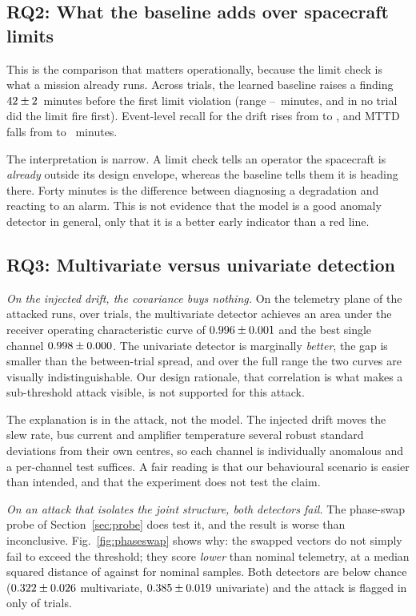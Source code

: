 \documentclass[10pt,journal]{IEEEtran}
\begin{document}
\subsection{RQ2: What the baseline adds over spacecraft limits}

This is the comparison that matters operationally, because the limit check is
what a mission already runs. Across trials, the learned baseline raises a
finding
$42 \pm 2$~minutes before the first limit violation (range
\expLeadMin--\expLeadMax~minutes, and in no trial did the limit fire first).
Event-level recall for the drift rises from \expRecAnomalyRules{} to
\expRecAnomalousBehavior{}, and MTTD falls from \expMttdAnomalyRules{} to
\expMttdAnomalyAll{}~minutes.

The interpretation is narrow. A limit check tells an operator the spacecraft
is \emph{already} outside its design envelope, whereas the baseline tells them
it is heading there. Forty minutes is the difference between diagnosing a
degradation and reacting to an alarm. This is not evidence that the model is a
good anomaly detector in general, only that it is a better early indicator than
a red line.

\subsection{RQ3: Multivariate versus univariate detection}

\emph{On the injected drift, the covariance buys nothing.} On the telemetry
plane of the attacked runs, over \expNumSeeds{} trials, the multivariate
detector achieves an area under the receiver operating characteristic curve of
$0.996 \pm 0.001$ and the best single channel
$0.998 \pm 0.000$. The univariate detector is marginally
\emph{better}, the gap is smaller than the between-trial spread, and over the
full range the two curves are visually indistinguishable.
Our design rationale, that correlation is what makes a sub-threshold attack
visible, is not supported for this attack.

The explanation is in the attack, not the model. The injected drift moves the
slew rate, bus current and amplifier temperature several robust standard
deviations from their own centres, so each channel is individually anomalous and
a per-channel test suffices. A fair reading is that our behavioural scenario is
easier than intended, and that the experiment does not test the claim.

\emph{On an attack that isolates the joint structure, both detectors fail.} The
phase-swap probe of Section~\ref{sec:probe} does test it, and the result is
worse than inconclusive. Fig.~\ref{fig:phaseswap} shows why: the swapped vectors
do not simply fail to exceed the threshold; they score \emph{lower} than
nominal telemetry, at a median squared distance of \expSwapMedianSwapped{}
against \expSwapMedianNormal{} for nominal samples. Both detectors are below chance
($0.322 \pm 0.026$ multivariate,
$0.385 \pm 0.019$ univariate) and the attack is flagged in
only \expSwapDetectedMulti{} of \expNumSeeds{} trials.
\end{document}
